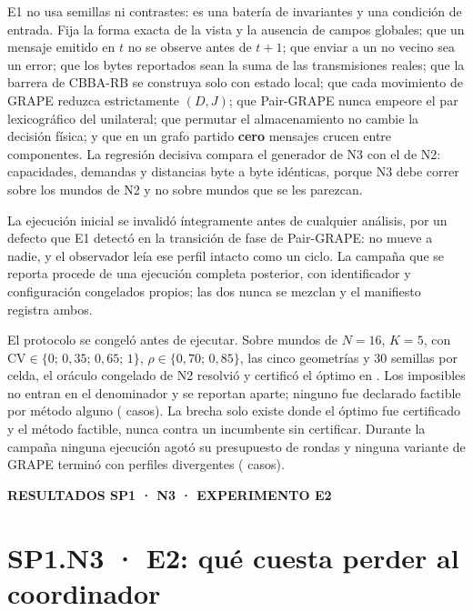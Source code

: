 \documentclass[12pt,a4paper]{article}
\newcommand{\leveltag}[1]{%
  \noindent\colorbox{VIUDark}{%
    \parbox{\dimexpr\textwidth-2\fboxsep\relax}{%
      \color{white}\sffamily\bfseries\small #1%
    }%
  }\par\smallskip
}
\begin{document}
E1 no usa semillas ni contrastes: es una batería de invariantes y una condición
de entrada. Fija la forma exacta de la vista y la ausencia de campos globales;
que un mensaje emitido en $t$ no se observe antes de $t+1$; que enviar a un no
vecino sea un error; que los bytes reportados sean la suma de las transmisiones
reales; que la barrera de CBBA-RB se construya solo con estado local; que cada
movimiento de GRAPE reduzca estrictamente $(D,J)$; que Pair-GRAPE nunca empeore
el par lexicográfico del unilateral; que permutar el almacenamiento no cambie la
decisión física; y que en un grafo partido \textbf{cero} mensajes crucen entre
componentes. La regresión decisiva compara el generador de N3 con el de N2:
capacidades, demandas y distancias byte a byte idénticas, porque N3 debe correr
sobre los mundos de N2 y no sobre mundos que se les parezcan.

La ejecución inicial se invalidó íntegramente antes de cualquier análisis, por
un defecto que E1 detectó en la transición de fase de Pair-GRAPE: no mueve a
nadie, y el observador leía ese perfil intacto como un ciclo. La campaña que se
reporta procede de una ejecución completa posterior, con identificador y
configuración congelados propios; las dos nunca se mezclan y el manifiesto
registra ambos.

El protocolo se congeló antes de ejecutar. Sobre \NThreeWorlds{} mundos de
$N=16$, $K=5$, con $\mathrm{CV}\in\{0;\,0{,}35;\,0{,}65;\,1\}$,
$\rho\in\{0{,}70;\,0{,}85\}$, las cinco geometrías y 30 semillas por celda, el
oráculo congelado de N2 resolvió \NThreeOracleFeasible{} y certificó el óptimo en
\NThreeOracleCertified. Los \NThreeOracleInfeasible{} imposibles no entran en el
denominador y se reportan aparte; ninguno fue declarado factible por método
alguno (\NThreeFalseFeasible{} casos). La brecha solo existe donde el óptimo fue
certificado y el método factible, nunca contra un incumbente sin certificar.
Durante la campaña ninguna ejecución agotó su presupuesto de rondas y ninguna
variante de GRAPE terminó con perfiles divergentes (\NThreeInconsistent{} casos).

\clearpage

\leveltag{RESULTADOS SP1 · N3 · EXPERIMENTO E2}
\section*{SP1.N3 · E2: qué cuesta perder al coordinador}
\end{document}
